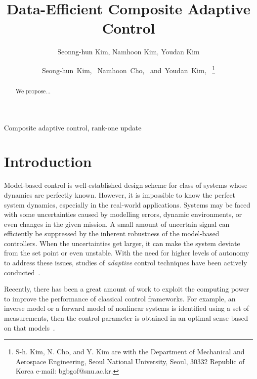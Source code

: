 \documentclass[]{IEEEtran}
\theoremstyle{definition}
\theoremstyle{remark}
\begin{document}
\title{Data-Efficient Composite Adaptive Control}
\author{Seonng-hun Kim, Namhoon Kim, Youdan Kim}
\author{Seong-hun~Kim,~
        Namhoon~Cho,~
        and~Youdan~Kim,~ %
\thanks{S-h. Kim, N. Cho, and Y. Kim are with the Department
of Mechanical and Aerospace Engineering, Seoul National University, Seoul,
30332 Republic of Korea e-mail: bgbgof@snu.ac.kr.}}
\maketitle



\begin{abstract}
	We propose...
\end{abstract}


\begin{IEEEkeywords}
	Composite adaptive control, rank-one update
\end{IEEEkeywords}


\section{Introduction}

Model-based control is well-established design scheme for class of systems
whose dynamics are perfectly known. However, it is impossible to know the
perfect system dynamics, especially in the real-world applications. Systems may
be faced with some uncertainties caused by modelling errors, dynamic
environments, or even changes in the given mission. A small amount of uncertain
signal can efficiently be suppressed by the inherent robustness of the
model-based controllers. When the uncertainties get larger, it can make the
system deviate from the set point or even unstable. With the need for higher
levels of autonomy to address these issues, studies of \textit{adaptive}
control techniques have been actively conducted~\cite{astrom_adaptive_1987}.

Recently, there has been a great amount of work to exploit the computing power
to improve the performance of classical control frameworks. For example, an
inverse model or a forward model of nonlinear systems is identified using a set
of measurements, then the control parameter is obtained in an optimal sense
based on that models~\cite{novara_data-driven_2018}.
\end{document}

